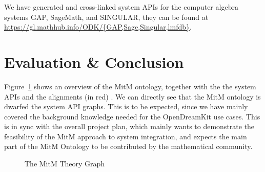 \documentclass[book]{deliverablereport}
\begin{document}
We have generated and cross-linked system APIs for the computer algebra systems GAP,
SageMath, and SINGULAR, they can be found at
\url{https://gl.mathhub.info/ODK/{GAP,Sage,Singular,lmfdb}}.

\section{Evaluation \& Conclusion}\label{sec:concl}
Figure~\ref{fig:MitM-graph} shows an overview of the MitM ontology, together with the the
system APIs and the alignments (in red) . We can directly see
that the MitM ontology is dwarfed the system API graphs. This is to be expected, since we
have mainly covered the background knowledge needed for the OpenDreamKit use cases. This
is in sync with the overall project plan, which mainly wants to demonstrate the
feasibility of the MitM approach to system integration, and expects the main part of the
MitM Ontology to be contributed by the mathematical community.  

\begin{figure}\centering
  \caption{The MitM Theory Graph}\label{fig:MitM-graph}
\end{figure}
\printbibliography
\end{document}
